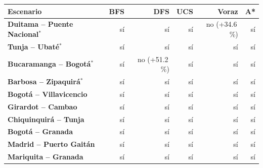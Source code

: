 \renewcommand{\arraystretch}{1.2}
\begin{tabular}{|l|r|r|r|r|r|}
\hline
\rowcolor{gray!20} \textbf{Escenario} & \textbf{BFS} & \textbf{DFS} & \textbf{UCS} & \textbf{Voraz} & \textbf{A*} \\
\hline
\textbf{Duitama -- Puente Nacional$^{*}$} & sí & sí & sí & no (+34.6\,\%) & sí \\
\hline
\textbf{Tunja -- Ubaté$^{*}$} & sí & sí & sí & sí & sí \\
\hline
\textbf{Bucaramanga -- Bogotá$^{*}$} & sí & no (+51.2\,\%) & sí & sí & sí \\
\hline
\textbf{Barbosa -- Zipaquirá$^{*}$} & sí & sí & sí & sí & sí \\
\hline
\textbf{Bogotá -- Villavicencio} & sí & sí & sí & sí & sí \\
\hline
\textbf{Girardot -- Cambao} & sí & sí & sí & sí & sí \\
\hline
\textbf{Chiquinquirá -- Tunja} & sí & sí & sí & sí & sí \\
\hline
\textbf{Bogotá -- Granada} & sí & sí & sí & sí & sí \\
\hline
\textbf{Madrid -- Puerto Gaitán} & sí & sí & sí & sí & sí \\
\hline
\textbf{Mariquita -- Granada} & sí & sí & sí & sí & sí \\
\hline
\end{tabular}
